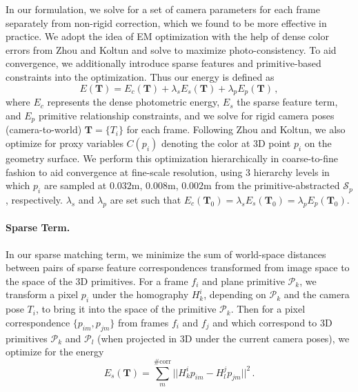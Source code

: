 In our formulation, we solve for a set of camera parameters for each frame separately from non-rigid correction, which we found to be more effective in practice. 
We adopt the idea of EM optimization with the help of dense color errors from Zhou and Koltun and solve to maximize photo-consistency.
To aid convergence, we additionally introduce sparse features and primitive-based constraints into the optimization.
Thus our energy is defined as
$$ E(\mathbf{T})=E_c(\mathbf{T}) + \lambda_s E_s(\mathbf{T}) + \lambda_p E_p(\mathbf{T})\,, $$
where $E_c$ represents the dense photometric energy, $E_s$ the sparse feature term, and $E_p$ primitive relationship constraints, and we solve for rigid camera poses (camera-to-world) $\mathbf{T}=\{T_i\}$ for each frame.
Following Zhou and Koltun, we also optimize for proxy variables $C(p_i)$ denoting the color at 3D point $p_i$ on the geometry surface.
We perform this optimization hierarchically in coarse-to-fine fashion to aid convergence at fine-scale resolution, using 3 hierarchy levels in which $p_i$ are sampled at $0.032$m, $0.008$m, $0.002$m from the primitive-abstracted $\mathcal{S}_p$, respectively.
$\lambda_s$ and $\lambda_p$ are set such that $E_c(\mathbf{T}_0)=\lambda_s E_s(\mathbf{T}_0) = \lambda_p E_p(\mathbf{T}_0)$.

\paragraph*{Sparse Term.}
In our sparse matching term, we minimize the sum of world-space distances between pairs of sparse feature correspondences transformed from image space to the space of the 3D primitives. 
For a frame $f_i$ and plane primitive $\mathcal{P}_k$, we transform a pixel $p_i$ under the homography $H_k^i$, depending on $\mathcal{P}_k$ and the camera pose $T_i$, to bring it into the space of the primitive $\mathcal{P}_k$.
Then for a pixel correspondence $\{p_{im},p_{jm}\}$ from frames $f_i$ and $f_j$ and which correspond to 3D primitives $\mathcal{P}_k$ and $\mathcal{P}_l$ (when projected in 3D under the current camera poses), we optimize for the energy
\begin{equation}
E_s(\mathbf{T}) = \sum_m^{\#\textrm{corr}} ||H_k^ip_{im} - H_l^j p_{jm}||^2\,.
\label{eq:pose-optim-sparse}
\end{equation}

